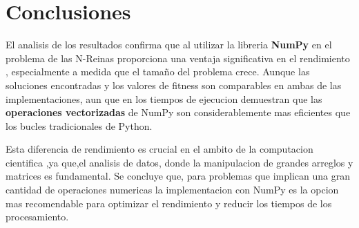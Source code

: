 \documentclass[journal]{IEEEtran}
\begin{document}
\section{Conclusiones} \label{sec:conclusiones}
El analisis de los resultados confirma que al utilizar  la libreria \textbf{NumPy} en el problema de las N-Reinas proporciona una ventaja significativa en el rendimiento , especialmente a medida que el tamaño del problema crece. Aunque las soluciones encontradas y los valores de fitness son comparables en ambas de las implementaciones, aun que en los tiempos de ejecucion demuestran que las \textbf{operaciones vectorizadas} de NumPy son considerablemente mas eficientes que los bucles tradicionales de Python.

Esta diferencia de rendimiento es crucial en el ambito de la computacion cientifica ,ya que,el analisis de datos, donde la manipulacion de grandes arreglos y matrices es fundamental. Se concluye que, para problemas que implican una gran cantidad de operaciones numericas la implementacion con NumPy es la opcion mas recomendable para optimizar el rendimiento y reducir los tiempos de los procesamiento.


\end{document}
